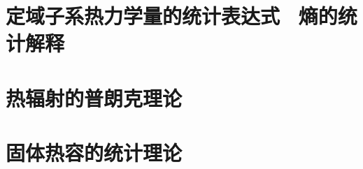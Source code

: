 \documentclass[12pt,a4paper]{article}
\begin{document}
\section{定域子系热力学量的统计表达式 ~熵的统计解释}











































\section{热辐射的普朗克理论}









































\section{固体热容的统计理论}
\end{document}
